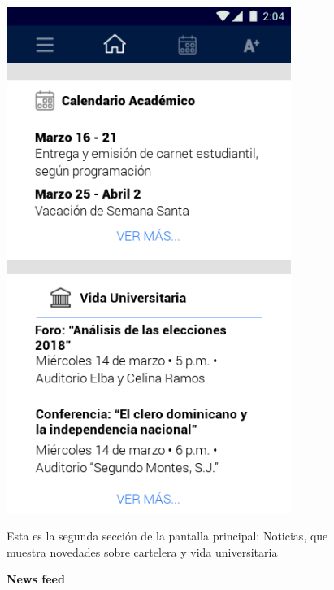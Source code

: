 \documentclass[12pt]{article}
\begin{document}
\begin{figure}[t]
	\begin{minipage}[t]{0.45\textwidth}
		\centering
		\caption{\textbf{News feed}}
		\label{fig:newsFeed}
		\includegraphics[width=0.825\textwidth]{img/3.png}
	\end{minipage}\hfill
	\begin{minipage}[t]{0.45\textwidth}
		\vspace*{10mm}
		Esta es la segunda sección de la pantalla principal: Noticias, que muestra novedades sobre cartelera y vida universitaria
	\end{minipage}


\end{figure}
\end{document}
